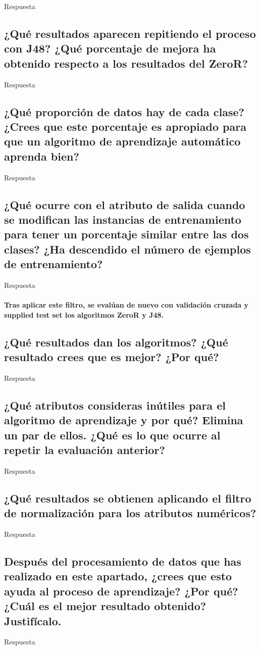\documentclass[12pt]{article}
\begin{document}
Respuesta

\subsection*{\small ¿Qué resultados aparecen repitiendo el proceso con J48?
¿Qué porcentaje de mejora ha obtenido respecto a los resultados del ZeroR?}

Respuesta

\subsection*{\small ¿Qué proporción de datos hay de cada clase? ¿Crees que este
porcentaje es apropiado para que un algoritmo de aprendizaje automático aprenda
bien?}

Respuesta

\subsection*{\small ¿Qué ocurre con el atributo de salida cuando se modifican
las instancias de entrenamiento para tener un porcentaje similar entre las dos
clases? ¿Ha descendido el número de ejemplos de entrenamiento?}

Respuesta

\paragraph{\small Tras aplicar este filtro, se evalúan de nuevo con validación
cruzada y supplied test set los algoritmos ZeroR y J48.}

\subsection*{\small ¿Qué resultados dan los algoritmos? ¿Qué resultado crees que
es mejor? ¿Por qué?}

Respuesta

\subsection*{\small ¿Qué atributos consideras inútiles para el algoritmo de
aprendizaje y por qué? Elimina un par de ellos. ¿Qué es lo que ocurre al
repetir la evaluación anterior?}

Respuesta

\subsection*{\small ¿Qué resultados se obtienen aplicando el filtro de
normalización para los atributos numéricos?}

Respuesta

\subsection*{\small Después del procesamiento de datos que has realizado en este
apartado, ¿crees que esto ayuda al proceso de aprendizaje? ¿Por qué? ¿Cuál es
el mejor resultado obtenido? Justifícalo.}

Respuesta
\end{document}
